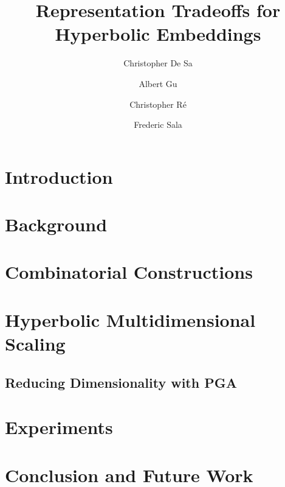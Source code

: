 \documentclass[10pt]{article}
\begin{document}
\title{Representation Tradeoffs for Hyperbolic Embeddings}

\author[$\ddagger$]{Christopher De Sa}
\author[$\dagger$]{Albert Gu}
\author[$\dagger$]{Christopher R{\'e}}
\author[$\dagger$]{Frederic Sala}

\maketitle


\begin{abstract}

\end{abstract}

\section{Introduction}
\label{sec:introduction}


\section{Background}
\label{sec:background}


\section{Combinatorial Constructions}
\label{sec:combinatorial}


\section{Hyperbolic Multidimensional Scaling}
\label{sec:MDS}


\subsection{Reducing Dimensionality with PGA}
\label{sec:PGA}


\section{Experiments}
\label{sec:experiments}


\section{Conclusion and Future Work}
\label{sec:conclusion}





\pagebreak

\appendix

\end{document}
